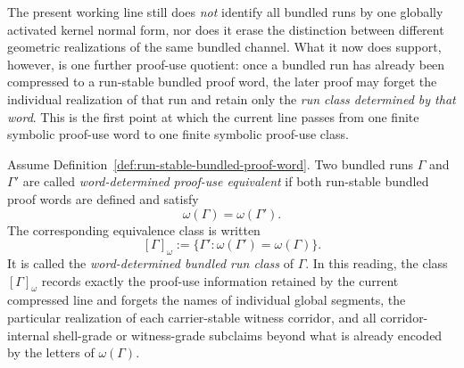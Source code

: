 \begin{remark}
\label{rem:status-of-the-first-word-determined-run-class-step}
The present working line still does \emph{not} identify all bundled runs by one globally activated kernel normal form, nor does it erase the distinction between different geometric realizations of the same bundled channel. What it now does support, however, is one further proof-use quotient: once a bundled run has already been compressed to a run-stable bundled proof word, the later proof may forget the individual realization of that run and retain only the \emph{run class determined by that word}. This is the first point at which the current line passes from one finite symbolic proof-use word to one finite symbolic proof-use class.
\end{remark}

\begin{definition}
\label{def:word-determined-bundled-run-class}
Assume Definition~\ref{def:run-stable-bundled-proof-word}. Two bundled runs $\Gamma$ and $\Gamma'$ are called \emph{word-determined proof-use equivalent} if both run-stable bundled proof words are defined and satisfy
\[
\omega(\Gamma)=\omega(\Gamma').
\]
The corresponding equivalence class is written
\[
[\Gamma]_{\omega}:=\{\Gamma' : \omega(\Gamma')=\omega(\Gamma)\}.
\]
It is called the \emph{word-determined bundled run class} of $\Gamma$. In this reading, the class $[\Gamma]_{\omega}$ records exactly the proof-use information retained by the current compressed line and forgets the names of individual global segments, the particular realization of each carrier-stable witness corridor, and all corridor-internal shell-grade or witness-grade subclaims beyond what is already encoded by the letters of $\omega(\Gamma)$.
\end{definition}

